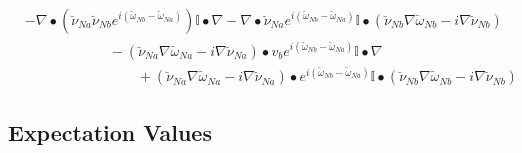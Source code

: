 \documentclass[aps,preprint]{revtex4}%
\begin{document}
\begin{description}
\begin{align}
&  -\nabla\bullet\left(  \breve{\nu}_{Na}\breve{\nu}_{Nb}e^{i\left(
\breve{\omega}_{Nb}-\breve{\omega}_{Na}\right)  }\right)  \mathbb{I}%
\bullet\nabla-\nabla\bullet\breve{\nu}_{Na}e^{i\left(  \breve{\omega}%
_{Nb}-\breve{\omega}_{Na}\right)  }\mathbb{I}\bullet\left(  \breve{\nu}%
_{Nb}\nabla\breve{\omega}_{Nb}-i\nabla\breve{\nu}_{Nb}\right) \nonumber\\
&  \qquad\qquad\qquad-\left(  \breve{\nu}_{Na}\nabla\breve{\omega}%
_{Na}-i\nabla\breve{\nu}_{Na}\right)  \bullet v_{b}e^{i\left(  \breve{\omega
}_{Nb}-\breve{\omega}_{Na}\right)  }\mathbb{I}\bullet\nabla\nonumber\\
&  \qquad\qquad\qquad\qquad+\left(  \breve{\nu}_{Na}\nabla\breve{\omega}%
_{Na}-i\nabla\breve{\nu}_{Na}\right)  \bullet e^{i\left(  \breve{\omega}%
_{Nb}-\breve{\omega}_{Na}\right)  }\mathbb{I}\bullet\left(  \breve{\nu}%
_{Nb}\nabla\breve{\omega}_{Nb}-i\nabla\breve{\nu}_{Nb}\right)
\end{align}

\end{description}

\subsection{Expectation Values}
\end{document}
